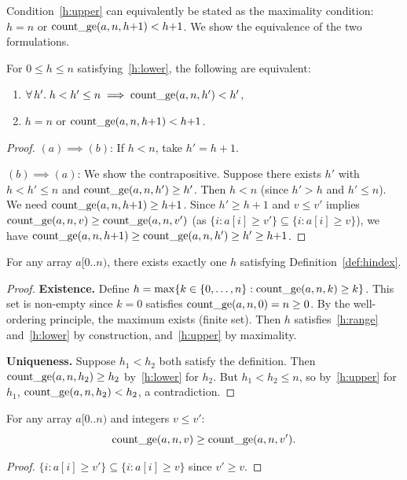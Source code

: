 \begin{remark}
Condition~\ref{h:upper} can equivalently be stated as the maximality condition:
$h = n$ or $\operatorname{count\_ge}(a, n, h{+}1) < h{+}1$.
We show the equivalence of the two formulations.
\end{remark}

\begin{lemma}\label{lem:max-equiv}
For $0 \leq h \leq n$ satisfying~\ref{h:lower}, the following are equivalent:
\begin{enumerate}[label=(\alph*)]
  \item $\forall\, h'.\; h < h' \leq n \implies \operatorname{count\_ge}(a, n, h') < h'$,
  \item $h = n$ or $\operatorname{count\_ge}(a, n, h{+}1) < h{+}1$.
\end{enumerate}
\end{lemma}
\begin{proof}
$(a) \implies (b)$: If $h < n$, take $h' = h{+}1$.

$(b) \implies (a)$: We show the contrapositive. Suppose there exists $h'$ with
$h < h' \leq n$ and $\operatorname{count\_ge}(a, n, h') \geq h'$. Then $h < n$ (since $h' > h$ and $h' \leq n$).
We need $\operatorname{count\_ge}(a, n, h{+}1) \geq h{+}1$.
Since $h' \geq h{+}1$ and $v \leq v'$ implies $\operatorname{count\_ge}(a,n,v) \geq \operatorname{count\_ge}(a,n,v')$
(as $\{i : a[i] \geq v'\} \subseteq \{i : a[i] \geq v\}$), we have
$\operatorname{count\_ge}(a,n,h{+}1) \geq \operatorname{count\_ge}(a,n,h') \geq h' \geq h{+}1$.
\end{proof}

\begin{theorem}\label{thm:unique}
For any array $a[0..n)$, there exists exactly one $h$ satisfying
Definition~\ref{def:hindex}.
\end{theorem}
\begin{proof}
\textbf{Existence.} Define $h = \max\{k \in \{0,\ldots,n\} : \operatorname{count\_ge}(a,n,k) \geq k\}$.
This set is non-empty since $k=0$ satisfies $\operatorname{count\_ge}(a,n,0) = n \geq 0$.
By the well-ordering principle, the maximum exists (finite set).
Then $h$ satisfies~\ref{h:range} and~\ref{h:lower} by construction, and~\ref{h:upper}
by maximality.

\textbf{Uniqueness.} Suppose $h_1 < h_2$ both satisfy the definition.
Then $\operatorname{count\_ge}(a,n,h_2) \geq h_2$ by~\ref{h:lower} for $h_2$.
But $h_1 < h_2 \leq n$, so by~\ref{h:upper} for $h_1$,
$\operatorname{count\_ge}(a,n,h_2) < h_2$, a contradiction.
\end{proof}

\begin{lemma}\label{lem:countge-mono}
For any array $a[0..n)$ and integers $v \leq v'$:
\[
  \operatorname{count\_ge}(a, n, v) \geq \operatorname{count\_ge}(a, n, v').
\]
\end{lemma}
\begin{proof}
$\{i : a[i] \geq v'\} \subseteq \{i : a[i] \geq v\}$ since $v' \geq v$.
\end{proof}

